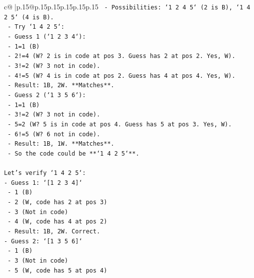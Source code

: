 \documentclass{article}
\begin{document}
{\begin{supertabular}{c@{$\;$}|p{.15\linewidth}@{}p{.15\linewidth}p{.15\linewidth}p{.15\linewidth}p{.15\linewidth}p{.15\linewidth}}
{{{\texttt{                    {-}   Possibilities: `1 2 4 5` (2 is B), `1 4 2 5` (4 is B).} \\
\texttt{                    {-}   Try `1 4 2 5`:} \\
\texttt{                        {-}   Guess 1 (`1 2 3 4`):} \\
\texttt{                            {-}   1=1 (B)} \\
\texttt{                            {-}   2!=4 (W? 2 is in code at pos 3. Guess has 2 at pos 2. Yes, W).} \\
\texttt{                            {-}   3!=2 (W? 3 not in code).} \\
\texttt{                            {-}   4!=5 (W? 4 is in code at pos 2. Guess has 4 at pos 4. Yes, W).} \\
\texttt{                            {-}   Result: 1B, 2W. **Matches**.} \\
\texttt{                        {-}   Guess 2 (`1 3 5 6`):} \\
\texttt{                            {-}   1=1 (B)} \\
\texttt{                            {-}   3!=2 (W? 3 not in code).} \\
\texttt{                            {-}   5=2 (W? 5 is in code at pos 4. Guess has 5 at pos 3. Yes, W).} \\
\texttt{                            {-}   6!=5 (W? 6 not in code).} \\
\texttt{                            {-}   Result: 1B, 1W. **Matches**.} \\
\texttt{    {-}   So the code could be **`1 4 2 5`**.} \\
\\ 
\texttt{Let's verify `1 4 2 5`:} \\
\texttt{{-}   Guess 1: `{[}1 2 3 4{]}`} \\
\texttt{    {-}   1 (B)} \\
\texttt{    {-}   2 (W, code has 2 at pos 3)} \\
\texttt{    {-}   3 (Not in code)} \\
\texttt{    {-}   4 (W, code has 4 at pos 2)} \\
\texttt{    {-}   Result: 1B, 2W. Correct.} \\
\texttt{{-}   Guess 2: `{[}1 3 5 6{]}`} \\
\texttt{    {-}   1 (B)} \\
\texttt{    {-}   3 (Not in code)} \\
\texttt{    {-}   5 (W, code has 5 at pos 4)} \\
}}}
\end{supertabular}}
\end{document}
